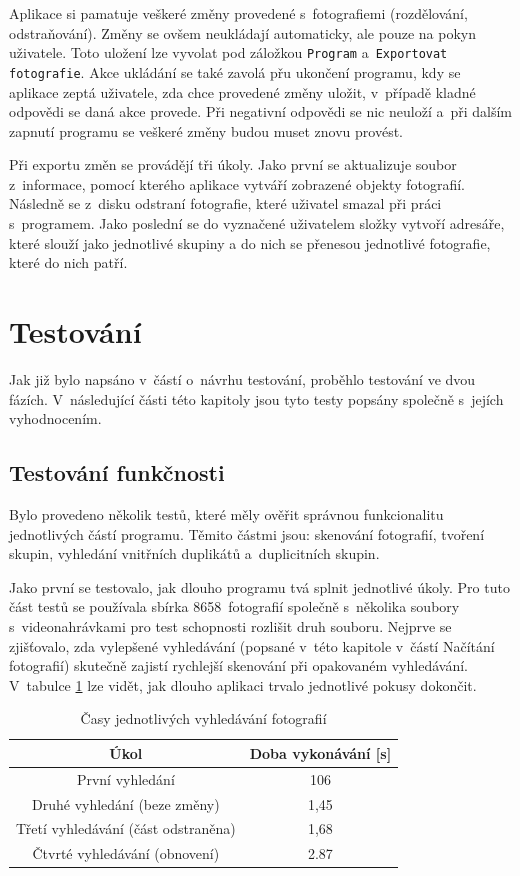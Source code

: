Aplikace si pamatuje veškeré změny provedené s~fotografiemi (rozdělování, odstraňování). Změny se ovšem neukládají automaticky, ale pouze na pokyn uživatele. Toto uložení lze vyvolat pod záložkou \texttt{Program} a~\texttt{Exportovat fotografie}. Akce ukládání se také zavolá přu ukončení programu, kdy se aplikace zeptá uživatele, zda chce provedené změny uložit, v~případě kladné odpovědi se daná akce provede. Při negativní odpovědi se nic neuloží a~při dalším zapnutí programu se veškeré změny budou muset znovu provést.

Při exportu změn se provádějí tři úkoly. Jako první se aktualizuje soubor z~informace, pomocí kterého aplikace vytváří zobrazené objekty fotografií. Následně se z~disku odstraní fotografie, které uživatel smazal při práci s~programem. Jako poslední se do vyznačené uživatelem složky vytvoří adresáře, které slouží jako jednotlivé skupiny a do nich se přenesou jednotlivé fotografie, které do nich patří.

\section{Testování}
Jak již bylo napsáno v~částí o~návrhu testování, proběhlo testování ve dvou fázích. V~následující části této kapitoly jsou tyto testy popsány společně s~jejích vyhodnocením.

\subsection*{Testování funkčnosti}

Bylo provedeno několik testů, které měly ověřit správnou funkcionalitu jednotlivých částí programu. Těmito částmi jsou: skenování fotografií, tvoření skupin, vyhledání vnitřních duplikátů a~duplicitních skupin.

Jako první se testovalo, jak dlouho programu tvá splnit jednotlivé úkoly. Pro tuto část testů se používala sbírka 8658~fotografií společně s~několika soubory s~videonahrávkami pro test schopnosti rozlišit druh souboru. Nejprve se zjišťovalo, zda vylepšené vyhledávání (popsané v~této kapitole v~částí Načítání fotografií) skutečně zajistí rychlejší skenování při opakovaném vyhledávání. V~tabulce \ref{sken_foto} lze vidět, jak dlouho aplikaci trvalo jednotlivé pokusy dokončit.

\begin{table}[h]
\centering
\begin{tabular}{|c|c|}
\hline
Úkol                                & Doba vykonávání {[}s{]} \\ \hline
První vyhledání                     & 106                     \\ \hline
Druhé vyhledání (beze změny)        & 1,45                    \\ \hline
Třetí vyhledávání (část odstraněna) & 1,68                    \\ \hline
Čtvrté vyhledávání (obnovení)       & 2.87                    \\ \hline
\end{tabular}
\caption{Časy jednotlivých vyhledávání fotografií}
\label{sken_foto}
\end{table}

